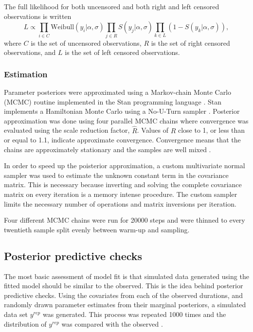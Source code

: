 \documentclass{article}
\begin{document}
The full likelihood for both uncensored and both right and left censored observations is written
\begin{equation*}
  L \propto \prod_{i \in C} \mathrm{Weibull}(y_{i} | \alpha, \sigma) \prod_{j \in R} S(y_j | \alpha, \sigma) \prod_{k \in L} \left(1 - S(y_{k} | \alpha, \sigma)\right),
\end{equation*}
where \(C\) is the set of uncensored observations, \(R\) is the set of right censored observations, and \(L\) is the set of left censored observations.



\subsubsection{Estimation}
Parameter posteriors were approximated using a Markov-chain Monte Carlo (MCMC) routine implemented in the Stan programming language \cite{2014stan}. Stan implements a Hamiltonian Monte Carlo using a No-U-Turn sampler \cite{Hoffman-Gelman:2011}. Posterior approximation was done using four parallel MCMC chains where convergence was evaluated using the scale reduction factor, \(\hat{R}\). Values of \(\hat{R}\) close to 1, or less than or equal to 1.1, indicate approximate convergence. Convergence means that the chains are approximately stationary and the samples are well mixed \cite{Gelman2013d}.

In order to speed up the poisterior approximation, a custom multivariate normal sampler was used to estimate the unknown constant term in the covariance matrix. This is necessary because inverting and solving the complete covariance matrix on every iteration is a memory intense procedure. The custom sampler limits the necessary number of operations and matrix inversions per iteration.

Four different MCMC chains were run for 20000 steps and were thinned to every twentieth sample split evenly between warm-up and sampling. 



\subsection{Posterior predictive checks}

The most basic assessment of model fit is that simulated data generated using the fitted model should be similar to the observed. This is the idea behind posterior predictive checks. Using the covariates from each of the observed durations, and randomly drawn parameter estimates from their marginal posteriors, a simulated data set \(y^{rep}\) was generated. This process was repeated 1000 times and the distribution of \(y^{rep}\) was compared with the observed \cite{Gelman2013d}.
\end{document}
